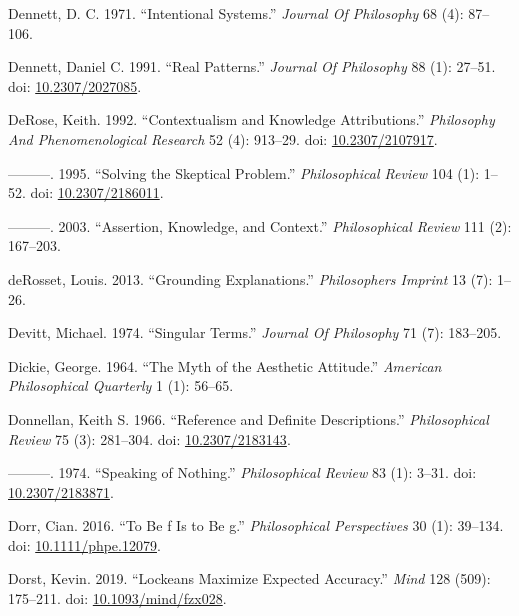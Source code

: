 \documentclass[
  10pt,
  letterpaper,
  DIV=11,
  numbers=noendperiod,
  twoside]{scrartcl}
\newlength{\cslhangindent}
\newenvironment{CSLReferences}[2] %
 {\begin{list}{}{%
  \setlength{\itemindent}{0pt}
  \setlength{\leftmargin}{0pt}
  \setlength{\parsep}{0pt}
  \ifodd #1
   \setlength{\leftmargin}{\cslhangindent}
   \setlength{\itemindent}{-1\cslhangindent}
  \fi
  \setlength{\itemsep}{#2\baselineskip}}}
 {\end{list}}
\begin{document}
\begin{CSLReferences}{1}{0}
Dennett, D. C. 1971. {``Intentional Systems.''} \emph{Journal Of
Philosophy} 68 (4): 87--106.

Dennett, Daniel C. 1991. {``Real Patterns.''} \emph{Journal Of
Philosophy} 88 (1): 27--51. doi:
\href{https://doi.org/10.2307/2027085}{10.2307/2027085}.

DeRose, Keith. 1992. {``Contextualism and Knowledge Attributions.''}
\emph{Philosophy And Phenomenological Research} 52 (4): 913--29. doi:
\href{https://doi.org/10.2307/2107917}{10.2307/2107917}.

---------. 1995. {``Solving the Skeptical Problem.''}
\emph{Philosophical Review} 104 (1): 1--52. doi:
\href{https://doi.org/10.2307/2186011}{10.2307/2186011}.

---------. 2003. {``Assertion, Knowledge, and Context.''}
\emph{Philosophical Review} 111 (2): 167--203.

deRosset, Louis. 2013. {``Grounding Explanations.''} \emph{Philosophers
Imprint} 13 (7): 1--26.

Devitt, Michael. 1974. {``Singular Terms.''} \emph{Journal Of
Philosophy} 71 (7): 183--205.

Dickie, George. 1964. {``The Myth of the Aesthetic Attitude.''}
\emph{American Philosophical Quarterly} 1 (1): 56--65.

Donnellan, Keith S. 1966. {``Reference and Definite Descriptions.''}
\emph{Philosophical Review} 75 (3): 281--304. doi:
\href{https://doi.org/10.2307/2183143}{10.2307/2183143}.

---------. 1974. {``Speaking of Nothing.''} \emph{Philosophical Review}
83 (1): 3--31. doi:
\href{https://doi.org/10.2307/2183871}{10.2307/2183871}.

Dorr, Cian. 2016. {``To Be f Is to Be g.''} \emph{Philosophical
Perspectives} 30 (1): 39--134. doi:
\href{https://doi.org/10.1111/phpe.12079}{10.1111/phpe.12079}.

Dorst, Kevin. 2019. {``Lockeans Maximize Expected Accuracy.''}
\emph{Mind} 128 (509): 175--211. doi:
\href{https://doi.org/10.1093/mind/fzx028}{10.1093/mind/fzx028}.


\end{CSLReferences}
\end{document}
